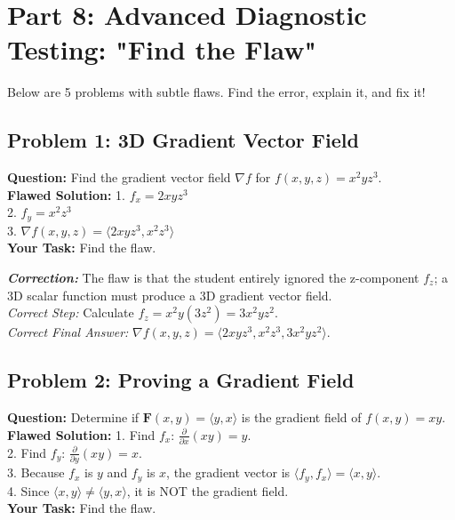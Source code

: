 \documentclass[11pt]{article}
\begin{document}
\section{Part 8: Advanced Diagnostic Testing: "Find the Flaw"}
Below are 5 problems with subtle flaws. Find the error, explain it, and fix it!

\subsection*{Problem 1: 3D Gradient Vector Field}
\textbf{Question:} Find the gradient vector field $\nabla f$ for $f(x,y,z) = x^2 y z^3$. \\
\textbf{Flawed Solution:}
1. $f_x = 2x y z^3$ \\
2. $f_y = x^2 z^3$ \\
3. $\nabla f(x,y,z) = \langle 2x y z^3, x^2 z^3 \rangle$ \\
\textbf{Your Task:} Find the flaw.

\vspace{0.2cm}
\noindent \textit{\textbf{Correction:}} The flaw is that the student entirely ignored the z-component $f_z$; a 3D scalar function must produce a 3D gradient vector field. \\
\textit{Correct Step:} Calculate $f_z = x^2 y (3z^2) = 3x^2 y z^2$. \\
\textit{Correct Final Answer:} $\nabla f(x,y,z) = \langle 2x y z^3, x^2 z^3, 3x^2 y z^2 \rangle$.

\subsection*{Problem 2: Proving a Gradient Field}
\textbf{Question:} Determine if $\mathbf{F}(x,y) = \langle y, x \rangle$ is the gradient field of $f(x,y) = xy$. \\
\textbf{Flawed Solution:}
1. Find $f_x$: $\frac{\partial}{\partial x}(xy) = y$. \\
2. Find $f_y$: $\frac{\partial}{\partial y}(xy) = x$. \\
3. Because $f_x$ is $y$ and $f_y$ is $x$, the gradient vector is $\langle f_y, f_x \rangle = \langle x, y \rangle$. \\
4. Since $\langle x, y \rangle \neq \langle y, x \rangle$, it is NOT the gradient field. \\
\textbf{Your Task:} Find the flaw.
\end{document}
